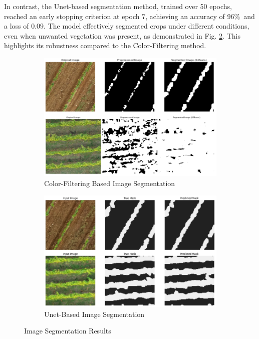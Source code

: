 \documentclass[conference]{IEEEtran}
\begin{document}
	
	In contrast, the Unet-based segmentation method, trained over 50 epochs, reached an early stopping criterion at epoch 7, achieving an accuracy of 96\%\ and a loss of 0.09. The model effectively segmented crops under different conditions, even when unwanted vegetation was present, as demonstrated in Fig.
	\ref{fig2:Unet_Segmentation}.
	This highlights its robustness compared to the Color-Filtering method.
	
		\begin{figure}[t]
				\begin{subfigure}{\linewidth}
				\centering
				\includegraphics[width=0.7\linewidth]{kmeans_predictions.png}
				\caption{Color-Filtering Based Image Segmentation}
				\label{fig2:kmeans}
			\end{subfigure}
			
			\vspace{0.5cm}
			
			\begin{subfigure}{\linewidth}
			\centering
			\includegraphics[width=0.7\linewidth]{unet_predictions.png}
			\caption{Unet-Based Image Segmentation}
			\label{fig2:Unet_Segmentation}
			\end{subfigure}
			
		\caption{Image Segmentation Results \cite{b5}}
		\label{fig:Image_Segmentation_Results}
		\end{figure}
	
\end{document}
